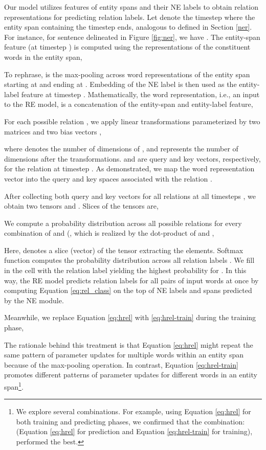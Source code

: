 \documentclass[11pt,a4paper]{article}
\begin{document}
Our model utilizes features of entity spans and their NE labels to obtain relation representations for predicting relation labels.
Let  denote the timestep where the entity span containing the timestep  ends, analogous to  defined in Section \ref{ner}. For instance, for sentence delineated in Figure \ref{fig:ner}, we have . The entity-span feature  (at timestep ) is computed using the representations of the constituent words in the entity span,

To rephrase,  is the max-pooling across word representations of the entity span starting at  and ending at .
Embedding of the NE label  is then used as the entity-label feature at timestep .
Mathematically, the word representation, i.e., an input to the RE model, is a concatenation of the entity-span and entity-label feature, 



For each possible relation , we apply linear transformations parameterized by two matrices  and two bias vectors ,

where  denotes the number of dimensions of , and  represents the number of dimensions after the transformations.  and  are query and key vectors, respectively, for the relation  at timestep .
As demonstrated, we map the word representation vector  into the query and key spaces associated with the relation .

After collecting both query and key vectors for all relations  at all timesteps , we obtain two tensors  and .
Slices of the tensors are,


We compute a probability distribution across all possible relations for every combination of  and  (, which is realized by the dot-product of  and ,

Here,  denotes a slice (vector) of the tensor extracting the  elements.
Softmax function  computes the probability distribution across all relation labels .
We fill in the cell  with the relation label yielding the highest probability for .
In this way, the RE model predicts relation labels for all pairs of input words at once by computing Equation \ref{eq:rel_class} on the top of NE labels and spans predicted by the NE module.

Meanwhile, we replace Equation \ref{eq:hrel} with \ref{eq:hrel-train} during the training phase,

The rationale behind this treatment is that Equation \ref{eq:hrel} might repeat the same pattern of parameter updates for multiple words within an entity span because of the max-pooling operation.
In contrast, Equation \ref{eq:hrel-train} promotes different patterns of parameter updates for different words in an entity span\footnote{We explore several combinations. For example, using Equation \ref{eq:hrel} for both training and predicting phases, we confirmed that the combination: (Equation \ref{eq:hrel} for prediction and Equation \ref{eq:hrel-train} for training), performed the best.}.
\end{document}
